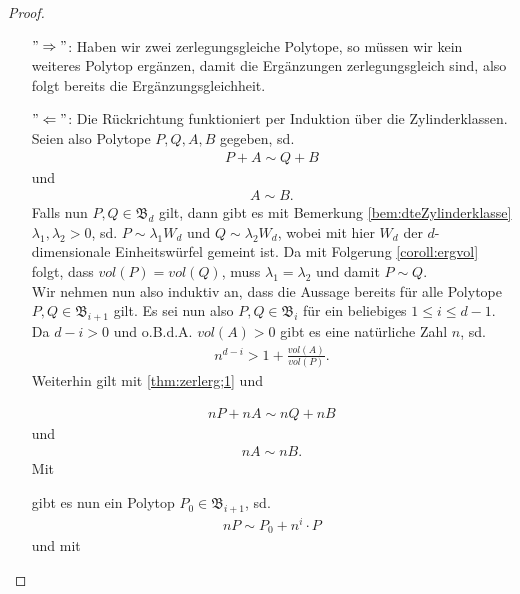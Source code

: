 \documentclass[11pt,titlepage]{article}
\theoremstyle{definition}
\theoremstyle{remark}
\begin{document}
	\begin{proof}
		\noindent
		\begin{itemize}
			\item[$"\Rightarrow"$:] Haben wir zwei zerlegungsgleiche Polytope, so müssen wir kein weiteres Polytop ergänzen, damit die Ergänzungen zerlegungsgleich sind, also folgt bereits die Ergänzungsgleichheit.
			
			\item[$"\Leftarrow"$:] Die Rückrichtung funktioniert per 
			Induktion über die Zylinderklassen. Seien also Polytope 
			$P,Q,A,B$ gegeben, sd. 
			\begin{align}
				P+A\sim Q+B \label{thm:zerlerg;1}
			\end{align}
			und
			\begin{align}
				A\sim B. \label{thm:zerlerg;2}
			\end{align}
			Falls nun $P,Q\in \mathfrak{B}_d$ gilt, dann gibt es mit Bemerkung 
			\ref{bem:dteZylinderklasse} 
			$\lambda_1,\lambda_2 >0$, sd. $P\sim \lambda_1 W_d$ und 
			$Q\sim \lambda_2 W_d$, wobei mit hier $W_d$ der $d$-dimensionale 
			Einheitswürfel gemeint ist. Da mit Folgerung \ref{coroll:ergvol} 
			folgt, dass $vol(P)=vol(Q)$, muss $\lambda_1 =\lambda_2$ und 
			damit $P\sim Q$. \\
			Wir nehmen nun also induktiv an, dass die Aussage bereits für alle 
			Polytope $P,Q\in\mathfrak{B}_{i+1}$ gilt. Es sei nun also 
			$P,Q\in\mathfrak{B}_i$ für ein beliebiges $1\leq i\leq d-1$. 
			Da $d-i>0$ und o.B.d.A. $vol(A)>0$ gibt es eine natürliche Zahl $n$, sd. 
			\begin{align}
				n^{d-i}>1+\frac{vol(A)}{vol(P)}. \label{thm:zerlerg;3}
			\end{align}
			Weiterhin gilt mit \ref{thm:zerlerg;1} und 
			
			
			\begin{align}
				nP+nA\sim nQ+nB \label{thm:zerlerg;4}
			\end{align}
			und
			\begin{align}
				nA\sim nB. \label{thm:zerlerg;5}
			\end{align}
			Mit 
			
			
			gibt es nun ein Polytop $P_0\in\mathfrak{B}_{i+1}$, sd.
			\begin{align}
				nP\sim P_0 +n^i\cdot P \label{thm:zerlerg;6}
			\end{align}
			und mit
			

\end{itemize}
\end{proof}
\end{document}
